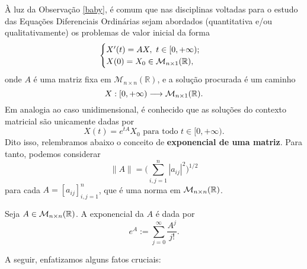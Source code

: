 À luz da Observação \ref{baby}, é comum que nas disciplinas voltadas para o estudo das Equações Diferenciais Ordinárias sejam abordados (quantitativa e/ou qualitativamente) os problemas de valor inicial da forma
\[
\begin{cases}
    X'(t)=AX,\ t\in [0,+\infty);\\
    X(0)=X_0 \in \mathcal M_{n\times 1} (\mathbb{R} ),
\end{cases}
\]
onde $A$ é uma matriz fixa em $\mathcal M _{n\times n} (\mathbb R )$, e a solução procurada é um caminho 
\[
X: [0,+\infty) \longrightarrow \mathcal M _{n\times 1} (\mathbb{R} ).
\]
Em analogia ao caso unidimensional, é conhecido que as soluções do contexto matricial são unicamente dadas por
\[
X(t)=e^{tA}X_0 \text{ para todo } t\in [0,+\infty ).
\]
Dito isso, relembramos abaixo o conceito de \textbf{exponencial de uma matriz}. Para tanto, podemos considerar 
\[
\|A\|=\bigg( \sum_{i,j=1}^{n} |a_{ij}|^2 \bigg)^{1/2}
\]
para cada $A=[a_{ij}]_{i,j=1}^{n}$, que é uma norma em $\mathcal M_{n\times n} (\mathbb{R})$.
\begin{definition}\label{expmatrix}
    Seja $A\in \mathcal M_{n\times n} (\mathbb{R})$. A exponencial da $A$ é dada por
    \begin{equation}\label{exp}
    \displaystyle e^{A}:=\sum_{j=0}^{\infty} \frac{A^j}{j!}. 
    \end{equation}
\end{definition}
A seguir, enfatizamos alguns fatos cruciais:

